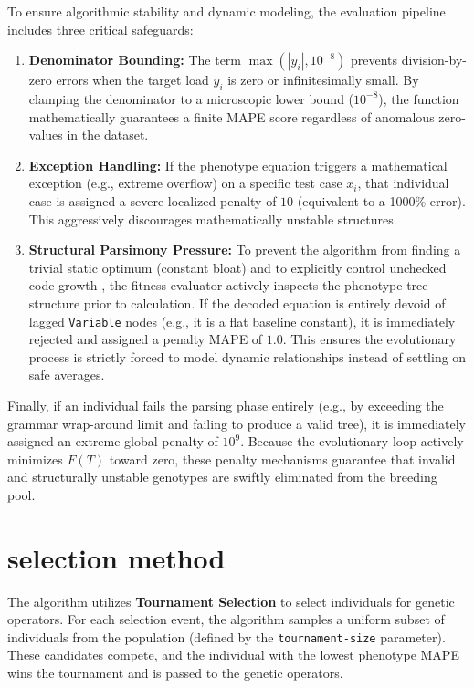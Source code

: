 \documentclass[12pt]{article}
\begin{document}
    To ensure algorithmic stability and dynamic modeling, the evaluation pipeline includes three critical safeguards:
    \begin{enumerate}
        \item \textbf{Denominator Bounding:} The term $\max(|y_i|, 10^{-8})$ prevents division-by-zero errors when the target load $y_i$ is zero or infinitesimally small. By clamping the denominator to a microscopic lower bound ($10^{-8}$), the function mathematically guarantees a finite MAPE score regardless of anomalous zero-values in the dataset.
        \item \textbf{Exception Handling:} If the phenotype equation triggers a mathematical exception (e.g., extreme overflow) on a specific test case $x_i$, that individual case is assigned a severe localized penalty of $10$ (equivalent to a 1000\% error). This aggressively discourages mathematically unstable structures.
        \item \textbf{Structural Parsimony Pressure:} To prevent the algorithm from finding a trivial static optimum (constant bloat) and to explicitly control unchecked code growth \cite{luke2006}, the fitness evaluator actively inspects the phenotype tree structure prior to calculation. If the decoded equation is entirely devoid of lagged \texttt{Variable} nodes (e.g., it is a flat baseline constant), it is immediately rejected and assigned a penalty MAPE of $1.0$. This ensures the evolutionary process is strictly forced to model dynamic relationships instead of settling on safe averages.
    \end{enumerate}
    
    Finally, if an individual fails the parsing phase entirely (e.g., by exceeding the grammar wrap-around limit and failing to produce a valid tree), it is immediately assigned an extreme global penalty of $10^9$. Because the evolutionary loop actively minimizes $F(T)$ toward zero, these penalty mechanisms guarantee that invalid and structurally unstable genotypes are swiftly eliminated from the breeding pool.

\section{selection method} \label{sec:selection_method}
    The algorithm utilizes \textbf{Tournament Selection} \cite{miller1995} to select individuals for genetic operators. For each selection event, the algorithm samples a uniform subset of individuals from the population (defined by the \verb|tournament-size| parameter). These candidates compete, and the individual with the lowest phenotype MAPE wins the tournament and is passed to the genetic operators.
    
\end{document}
